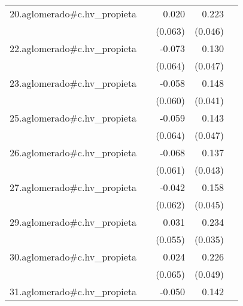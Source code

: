 {\begin{longtable}{l*{4}{D{.}{.}{-1}}}
\addlinespace
20.aglomerado#c.hv\_propieta&                     &       0.020         &       0.223\sym{***}&                     \\
            &                     &     (0.063)         &     (0.046)         &                     \\
\addlinespace
22.aglomerado#c.hv\_propieta&                     &      -0.073         &       0.130\sym{**} &                     \\
            &                     &     (0.064)         &     (0.047)         &                     \\
\addlinespace
23.aglomerado#c.hv\_propieta&                     &      -0.058         &       0.148\sym{***}&                     \\
            &                     &     (0.060)         &     (0.041)         &                     \\
\addlinespace
25.aglomerado#c.hv\_propieta&                     &      -0.059         &       0.143\sym{**} &                     \\
            &                     &     (0.064)         &     (0.047)         &                     \\
\addlinespace
26.aglomerado#c.hv\_propieta&                     &      -0.068         &       0.137\sym{**} &                     \\
            &                     &     (0.061)         &     (0.043)         &                     \\
\addlinespace
27.aglomerado#c.hv\_propieta&                     &      -0.042         &       0.158\sym{***}&                     \\
            &                     &     (0.062)         &     (0.045)         &                     \\
\addlinespace
29.aglomerado#c.hv\_propieta&                     &       0.031         &       0.234\sym{***}&                     \\
            &                     &     (0.055)         &     (0.035)         &                     \\
\addlinespace
30.aglomerado#c.hv\_propieta&                     &       0.024         &       0.226\sym{***}&                     \\
            &                     &     (0.065)         &     (0.049)         &                     \\
\addlinespace
31.aglomerado#c.hv\_propieta&                     &      -0.050         &       0.142\sym{**} &                     \\

\end{longtable}}
